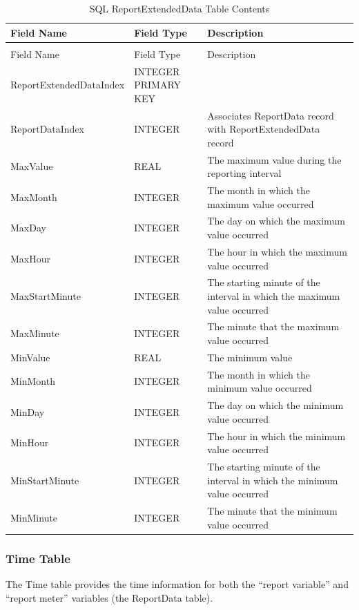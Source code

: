{\scriptsize
\begin{longtable}[c]{>{\raggedright}p{1.5in}>{\raggedright}p{1.5in}>{\raggedright}p{3.0in}}
\caption{SQL ReportExtendedData Table Contents \label{table:table-9.-sql-reportextendeddata-table}} \tabularnewline
\toprule
Field Name & Field Type & Description \tabularnewline
\midrule
\endfirsthead

\caption[]{SQL ReportExtendedData Table Contents} \tabularnewline
\toprule
Field Name & Field Type & Description \tabularnewline
\midrule
\endhead

ReportExtended\-Data\-Index & INTEGER PRIMARY KEY &  \tabularnewline
ReportDataIndex & INTEGER & Associates ReportData record with ReportExtendedData record \tabularnewline
MaxValue & REAL & The maximum value during the reporting interval \tabularnewline
MaxMonth & INTEGER & The month in which the maximum value occurred \tabularnewline
MaxDay & INTEGER & The day on which the maximum value occurred \tabularnewline
MaxHour & INTEGER & The hour in which the maximum value occurred \tabularnewline
MaxStartMinute & INTEGER & The starting minute of the interval in which the maximum value occurred \tabularnewline
MaxMinute & INTEGER & The minute that the maximum value occurred \tabularnewline
MinValue & REAL & The minimum value \tabularnewline
MinMonth & INTEGER & The month in which the minimum value occurred \tabularnewline
MinDay & INTEGER & The day on which the minimum value occurred \tabularnewline
MinHour & INTEGER & The hour in which the minimum value occurred \tabularnewline
MinStartMinute & INTEGER & The starting minute of the interval in which the minimum value occurred \tabularnewline
MinMinute & INTEGER & The minute that the minimum value occurred \tabularnewline
\bottomrule
\end{longtable}}

\subsubsection{Time Table}

The Time table provides the time information for both the “report variable” and “report meter” variables (the ReportData table).


